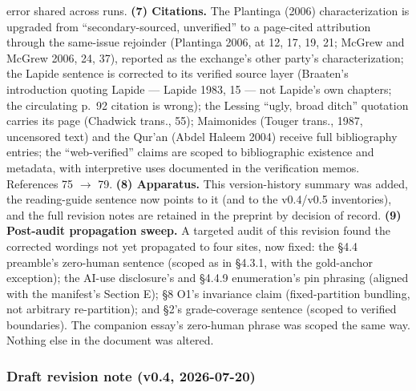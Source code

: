 error shared across runs. \textbf{(7) Citations.} The Plantinga (2006) characterization is upgraded from ``secondary-sourced, unverified'' to a page-cited attribution through the same-issue rejoinder (Plantinga 2006, at 12, 17, 19, 21; McGrew and McGrew 2006, 24, 37), reported as the exchange's other party's characterization; the Lapide sentence is corrected to its verified source layer (Braaten's introduction quoting Lapide --- Lapide 1983, 15 --- not Lapide's own chapters; the circulating p.~92 citation is wrong); the Lessing ``ugly, broad ditch'' quotation carries its page (Chadwick trans., 55); Maimonides (Touger trans., 1987, uncensored text) and the Qur'an (Abdel Haleem 2004) receive full bibliography entries; the ``web-verified'' claims are scoped to bibliographic existence and metadata, with interpretive uses documented in the verification memos. References 75 $\to$ 79. \textbf{(8) Apparatus.} This version-history summary was added, the reading-guide sentence now points to it (and to the v0.4/v0.5 inventories), and the full revision notes are retained in the preprint by decision of record. \textbf{(9) Post-audit propagation sweep.} A targeted audit of this revision found the corrected wordings not yet propagated to four sites, now fixed: the \S{}4.4 preamble's zero-human sentence (scoped as in \S{}4.3.1, with the gold-anchor exception); the AI-use disclosure's and \S{}4.4.9 enumeration's pin phrasing (aligned with the manifest's Section E); \S{}8 O1's invariance claim (fixed-partition bundling, not arbitrary re-partition); and \S{}2's grade-coverage sentence (scoped to verified boundaries). The companion essay's zero-human phrase was scoped the same way. Nothing else in the document was altered.

\subsubsection{Draft revision note (v0.4, 2026-07-20)}\label{draft-revision-note-v0.4-2026-07-20}

